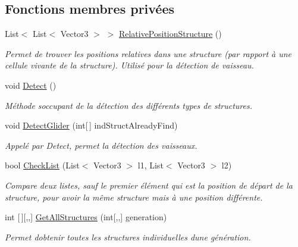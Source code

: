 \subsection*{Fonctions membres privées}
\begin{DoxyCompactItemize}
\item 
List$<$ List$<$ Vector3 $>$ $>$ \mbox{\hyperlink{class_detection_a168b07e1ffdca2d91d8c5e251a470a25}{Relative\+Position\+Structure}} ()
\begin{DoxyCompactList}\small\item\em Permet de trouver les positions relatives dans une structure (par rapport à une cellule vivante de la structure). Utilisé pour la détection de vaisseau. \end{DoxyCompactList}\item 
void \mbox{\hyperlink{class_detection_a2d43ae8dc03c4247fd0d39787b72213a}{Detect}} ()
\begin{DoxyCompactList}\small\item\em Méthode s\textquotesingle{}occupant de la détection des différents types de structures. \end{DoxyCompactList}\item 
void \mbox{\hyperlink{class_detection_a88c0afc7566ffe8ac32fe1c21da192df}{Detect\+Glider}} (int\mbox{[}$\,$\mbox{]} ind\+Struct\+Already\+Find)
\begin{DoxyCompactList}\small\item\em Appelé par Detect, permet la détection des vaisseaux. \end{DoxyCompactList}\item 
bool \mbox{\hyperlink{class_detection_a2d8aeb536aa1051f0522f8317b14b36e}{Check\+List}} (List$<$ Vector3 $>$ l1, List$<$ Vector3 $>$ l2)
\begin{DoxyCompactList}\small\item\em Compare deux listes, sauf le premier élément qui est la position de départ de la structure, pour avoir la même structure mais à une position différente. \end{DoxyCompactList}\item 
int \mbox{[}$\,$\mbox{]}\mbox{[},,\mbox{]} \mbox{\hyperlink{class_detection_a56dffa1e7a06c20bfaa24ac287a9883f}{Get\+All\+Structures}} (int\mbox{[},,\mbox{]} generation)
\begin{DoxyCompactList}\small\item\em Permet d\textquotesingle{}obtenir toutes les structures individuelles d\textquotesingle{}une génération. \end{DoxyCompactList}\item 

\end{DoxyCompactItemize}
